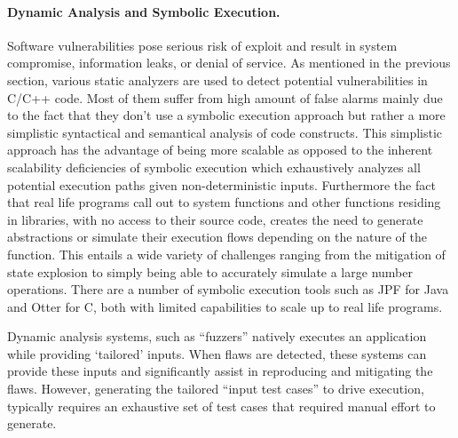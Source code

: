 \documentclass[a4paper,11pt]{article}
\newcommand{\project}[1]{\textbf{#1}\xspace}
\newcommand{\SECURITY}{\project{Elysian}}
\newcommand{\TheProject}{\SECURITY}
\begin{document}
%


\paragraph{Dynamic Analysis and Symbolic Execution.}
Software vulnerabilities pose serious risk of exploit and result in system compromise, information leaks, or denial of service. As mentioned in the previous section, various static analyzers are used to detect potential vulnerabilities in C/C++ code. Most of them suffer from high amount of false alarms mainly due to the fact that they don’t use a symbolic execution approach but rather a more simplistic syntactical and semantical analysis of code constructs. This simplistic approach has the advantage of being more scalable as opposed to the inherent scalability deficiencies of symbolic execution which exhaustively analyzes all potential execution paths given non-deterministic inputs. Furthermore the fact that real life programs call out to system functions and other functions residing in libraries, with no access to their source code, creates the need to generate abstractions or simulate their execution flows depending on the nature of the function. This entails a wide variety of challenges ranging from the mitigation of state explosion to simply being able to accurately simulate a large number operations. There are a number of symbolic execution tools such as JPF for Java and Otter for C, both with limited capabilities to scale up to real life programs.

Dynamic analysis systems, such as “fuzzers” natively executes an application while providing ‘tailored’ inputs. When flaws are detected, these systems can provide these inputs and significantly assist in reproducing and mitigating the flaws. However, generating the tailored “input test cases” to drive execution, typically requires an exhaustive set of test cases that required manual effort to generate. 
\end{document}
